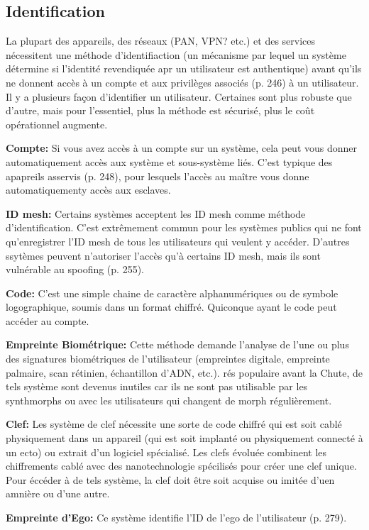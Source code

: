\subsection{Identification} 

La plupart des appareils, des réseaux (PAN, VPN? etc.) et des services nécessitent une méthode d'identifiaction (un mécanisme par lequel un système détermine si l'identité revendiquée apr un utilisateur est authentique) avant qu'ils ne donnent accès à un compte et aux privilèges associés (p. 246) à un utilisateur. Il y a plusieurs façon d'identifier un utilisateur. Certaines sont plus robuste que d'autre, mais pour l'essentiel, plus la méthode est sécurisé, plus le coût opérationnel augmente. 

\textbf{Compte:} Si vous avez accès à un compte sur un système, cela peut vous donner automatiquement accès aux système et sous-système liés. C'est typique des apapreils asservis (p. 248), pour lesquels l'accès au maître vous donne automatiquementy accès aux esclaves. 

\textbf{ID mesh:} Certains systèmes acceptent les ID mesh comme méthode d'identification. C'est extrêmement commun pour les systèmes publics qui ne font qu'enregistrer l'ID mesh de tous les utilisateurs qui veulent y accéder. D'autres ssytèmes peuvent n'autoriser l'accès qu'à certains ID mesh, mais ils sont vulnérable au spoofing (p. 255). 

\textbf{Code:} C'est une simple chaine de caractère alphanumériques ou de symbole logographique, soumis dans un format chiffré. Quiconque ayant le code peut accéder au compte. 

\textbf{Empreinte Biométrique:} Cette méthode demande l'analyse de l'une ou plus des signatures biométriques de l'utilisateur (empreintes digitale, empreinte palmaire, scan rétinien, échantillon d'ADN, etc.). rés populaire avant la Chute, de tels système sont devenus inutiles car ils ne sont pas utilisable par les synthmorphs ou avec les utilisateurs qui changent de morph régulièrement. 

\textbf{Clef:} Les système de clef nécessite une sorte de code chiffré qui est soit cablé physiquement dans un appareil (qui est soit implanté ou physiquement connecté à un ecto) ou extrait d'un logiciel spécialisé. Les clefs évoluée combinent les chiffrements cablé avec des nanotechnologie spécilisés pour créer une clef unique. Pour éccéder à de tels système, la clef doit être soit acquise ou imitée d'uen amnière ou d'une autre. 

\textbf{Empreinte d'Ego:} Ce système identifie l'ID de l'ego de l'utilisateur (p. 279). 


